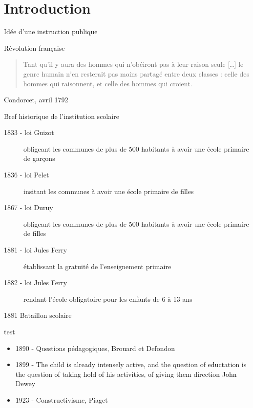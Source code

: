 
\section{Introduction}

\begin{frame}{Idée d'une instruction publique}

Révolution française

\begin{quote}
Tant qu'il y aura des hommes qui n'obéiront pas à leur raison seule [\ldots] le genre humain n'en resterait pas moins partagé entre deux classes : celle des hommes qui raisonnent, et celle 
des hommes qui croient.
\end{quote}
Condorcet, avril 1792

\end{frame}

\begin{frame}{Bref historique de l'institution scolaire}
\begin{description}
\item[1833 - loi Guizot] obligeant les communes de plus de 500 habitants à avoir une école primaire de garçons
\item[1836 - loi Pelet] insitant les communes à avoir une école primaire de filles
\item[1867 - loi Duruy] obligeant les communes de plus de 500 habitants à avoir une école primaire de filles
\item[1881 - loi Jules Ferry] établissant la gratuité de l'enseignement primaire
\item[1882 - loi Jules Ferry] rendant l'école obligatoire pour les enfants de 6 à 13 ans
\end{description}

\end{frame}

\begin{frame}{1881 Bataillon scolaire}
\end{frame}

\begin{frame}{test}
  \begin{itemize}
  \item 1890 - Questions pédagogiques, Brouard et Defondon
  \item 1899 - \og{}The child is already intensely active, and the question 
  of eductation is the question of taking hold of his activities, of 
  giving them direction\fg{} John Dewey
  \item 1923 - Constructivisme, Piaget
  \end{itemize}
  
\end{frame}

